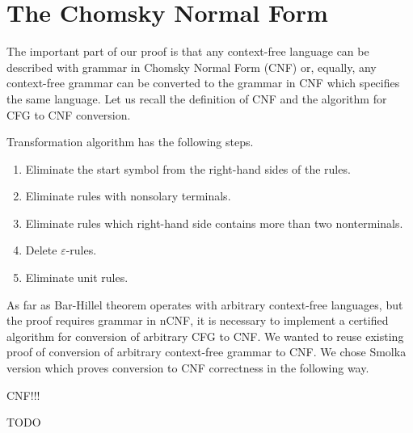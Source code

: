 \section{The Chomsky Normal Form}

The important part of our proof is that any context-free language can be described with grammar in Chomsky Normal Form (CNF) or, equally, any context-free grammar can be converted to the grammar in CNF which specifies the same language.
Let us recall the definition of CNF and the algorithm for CFG to CNF conversion.

Transformation algorithm has the following steps.
\begin{enumerate}
\item Eliminate the start symbol from the right-hand sides of the rules.
\item Eliminate rules with nonsolary terminals.
\item Eliminate rules which right-hand side contains more than two nonterminals.
\item Delete $\varepsilon$-rules.
\item Eliminate unit rules.
\end{enumerate}

As far as Bar-Hillel theorem operates with arbitrary context-free languages, but the proof requires grammar in nCNF, it is necessary to implement a certified algorithm for conversion of arbitrary CFG to CNF.
We wanted to reuse existing proof of conversion of arbitrary context-free grammar to CNF.
We chose Smolka version which proves conversion to CNF correctness in the following way.
\begin{listing}[h]
    \begin{pyglist}[language=coq, numbers=none, numbersep=5pt]
  CNF!!!
    \end{pyglist}
    \caption{TODO}
    \label{lst:verbments1}
\end{listing}



